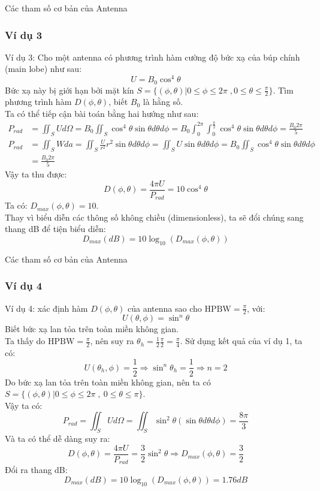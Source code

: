\documentclass[8pt]{beamer}
\begin{document}
\begin{frame}{Các tham số cơ bản của Antenna}
\subsubsection{Ví dụ 3}
Ví dụ 3: Cho một antenna có phương trình hàm cường độ bức xạ của búp chính (main lobe) như sau:
$$U=B_{0}\cos^4{\theta}$$
Bức xạ này bị giới hạn bởi mặt kín $S=\{(\phi,\theta)|0\leq\phi\leq 2\pi\; ,0\leq\theta\leq\frac{\pi}{2}\}$. Tìm phương trình hàm $D(\phi,\theta)$, biết $B_{0}$ là hằng số.
\\ Ta có thể tiếp cận bài toán bằng hai hướng như sau:
\begin{equation*}
\begin{split}
	P_{rad}&=\iint_{S}Ud\Omega=B_{0}\iint_{S}\cos^4{\theta}\sin{\theta}d\theta d\phi=B_{0}\int_{0}^{2\pi}\int_{0}^{\frac{\pi}{2}}\cos^4{\theta}\sin{\theta}d\theta d\phi=\frac{B_{0}2\pi}{5}\\
	P_{rad}&=\iint_{S}Wda=\iint_{S}\frac{U}{r^2}r^2\sin{\theta}d\theta d\phi=\iint_{S}U\sin{\theta}d\theta d\phi=B_{0}\iint_{S}\cos^4{\theta}\sin{\theta}d\theta d\phi\\&=\frac{B_{0}2\pi}{5}
\end{split}
\end{equation*}
Vậy ta thu được:
$$D(\phi,\theta)=\frac{4\pi U}{P_{rad}}=10\cos^4{\theta}$$
Ta có: $D_{max}(\phi,\theta)=10$.
\\\alert{Thay vì biểu diễn các thông số không chiều (dimensionless), ta sẽ đổi chúng sang thang dB để tiện biểu diễn:}
$$D_{max}(dB)=10\log_{10}(D_{max}(\phi,\theta))$$
\end{frame}
\begin{frame}{Các tham số cơ bản của Antenna}
\subsubsection{Ví dụ 4}
Ví dụ 4: xác định hàm $D(\phi,\theta)$ của antenna sao cho $\text{HPBW}=\frac{\pi}{2}$, với:
$$U(\theta,\phi)=\sin^n{\theta}$$
Biết bức xạ lan tỏa trên toàn miền không gian.
\\ Ta thấy do $\text{HPBW}=\frac{\pi}{2}$, nên suy ra $\theta_{h}=\frac{1}{2}\frac{\pi}{2}=\frac{\pi}{4}$. Sử dụng kết quả của ví dụ 1, ta có:
$$U(\theta_{h},\phi)=\frac{1}{2}\Rightarrow \sin^n{\theta_{h}}=\frac{1}{2}\Rightarrow n=2$$
Do bức xạ lan tỏa trên toàn miền không gian, nên ta có $S=\{(\phi,\theta)|0\leq\phi\leq 2\pi\;, \ 0\leq\theta\leq\pi\}$.
\\ Vậy ta có:
$$P_{rad}=\iint_{S}Ud\Omega=\iint_{S}\sin^2{\theta}(\sin{\theta}d\theta d\phi)=\frac{8\pi}{3}$$
Và ta có thể dễ dàng suy ra:
$$D(\phi,\theta)=\frac{4\pi U}{P_{rad}}=\frac{3}{2}\sin^2{\theta}\Rightarrow D_{max}{(\phi,\theta)}=\frac{3}{2}$$
Đổi ra thang dB: $$D_{max}(dB)=10\log_{10}(D_{max}(\phi,\theta))=1.76dB$$
\end{frame}
\end{document}
